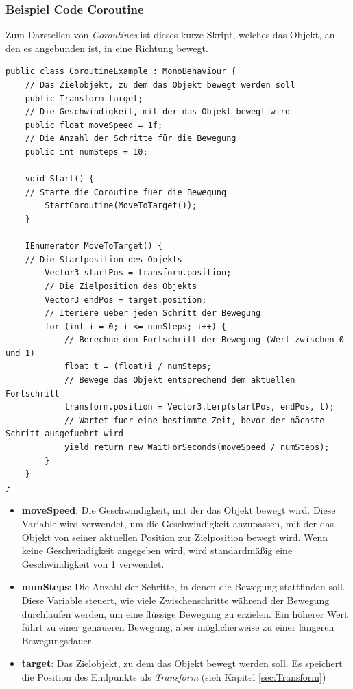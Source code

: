 \subsubsection*{Beispiel Code Coroutine}
Zum Darstellen von \textit{Coroutines} ist dieses kurze Skript, welches das Objekt, an den es angebunden ist, in eine Richtung bewegt.
\begin{lstlisting}[style=csharp, caption={Coroutine Beispiel}, label={code:coroutineBsp}]
public class CoroutineExample : MonoBehaviour {
    // Das Zielobjekt, zu dem das Objekt bewegt werden soll
    public Transform target;
    // Die Geschwindigkeit, mit der das Objekt bewegt wird
    public float moveSpeed = 1f;
    // Die Anzahl der Schritte für die Bewegung
    public int numSteps = 10;

    void Start() {
    // Starte die Coroutine fuer die Bewegung
        StartCoroutine(MoveToTarget());
    }

    IEnumerator MoveToTarget() {
    // Die Startposition des Objekts
        Vector3 startPos = transform.position;
        // Die Zielposition des Objekts
        Vector3 endPos = target.position;
        // Iteriere ueber jeden Schritt der Bewegung
        for (int i = 0; i <= numSteps; i++) {
            // Berechne den Fortschritt der Bewegung (Wert zwischen 0 und 1)
            float t = (float)i / numSteps;
            // Bewege das Objekt entsprechend dem aktuellen Fortschritt
            transform.position = Vector3.Lerp(startPos, endPos, t);
            // Wartet fuer eine bestimmte Zeit, bevor der nächste Schritt ausgefuehrt wird
            yield return new WaitForSeconds(moveSpeed / numSteps);
        }
    }
}
\end{lstlisting}
\begin{itemize}
    \item \textbf{moveSpeed}: Die Geschwindigkeit, mit der das Objekt bewegt wird. Diese Variable wird verwendet, um die Geschwindigkeit anzupassen, mit der das Objekt von seiner aktuellen Position zur Zielposition bewegt wird. Wenn keine Geschwindigkeit angegeben wird, wird standardmäßig eine Geschwindigkeit von 1 verwendet.
    \item \textbf{numSteps}: Die Anzahl der Schritte, in denen die Bewegung stattfinden soll. Diese Variable steuert, wie viele Zwischenschritte während der Bewegung durchlaufen werden, um eine flüssige Bewegung zu erzielen. Ein höherer Wert führt zu einer genaueren Bewegung, aber möglicherweise zu einer längeren Bewegungsdauer.

    \item \textbf{target}: Das Zielobjekt, zu dem das Objekt bewegt werden soll. Es speichert die Position des Endpunkts als  \textit{Transform} (sieh Kapitel \ref{sec:Transform})
\end{itemize}
